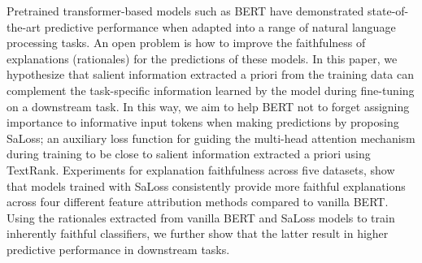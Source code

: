 Pretrained transformer-based models such as BERT have demonstrated state-of-the-art predictive performance when adapted into a range of natural language processing tasks. An open problem is how to improve the faithfulness of explanations (rationales) for the predictions of these models. In this paper, we hypothesize that salient information extracted a priori from the training data can complement the task-specific information learned by the model during fine-tuning on a downstream task. In this way, we aim to help BERT not to forget assigning importance to informative input tokens when making predictions by proposing SaLoss; an auxiliary loss function for guiding the multi-head attention mechanism during training to be close to salient information extracted a priori using TextRank. Experiments for explanation faithfulness across five datasets, show that models trained with SaLoss consistently provide more faithful explanations across four different feature attribution methods compared to vanilla BERT. Using the rationales extracted from vanilla BERT and SaLoss models to train inherently faithful classifiers, we further show that the latter result in higher predictive performance in downstream tasks.
